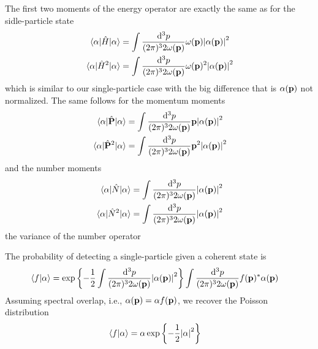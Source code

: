 The first two moments of the energy operator are exactly the same as for the sidle-particle state
\begin{align}
	\expval{\hat{H}}{\alpha}
	&=
	\int\frac{\dd[3]{p}}{(2\pi)^32\omega(\vb{p})}
	\omega(\vb{p})
	\abs{\alpha(\vb{p})}^2
	\\
	\expval{\hat{H}^2}{\alpha}
	&=
	\int\frac{\dd[3]{p}}{(2\pi)^32\omega(\vb{p})}
	\omega(\vb{p})^2
	\abs{\alpha(\vb{p})}^2
\end{align}
which is similar to our single-particle case with the big difference that is $\alpha(\vb{p})$ not normalized.
The same follows for the momentum moments
\begin{align}
	\expval{\hat{\vb{P}}}{\alpha}
	&=
	\int\frac{\dd[3]{p}}{(2\pi)^32\omega(\vb{p})}
	\vb{p}
	\abs{\alpha(\vb{p})}^2
	\\
	\expval{\hat{\vb{P}}^2}{\alpha}
	&=
	\int\frac{\dd[3]{p}}{(2\pi)^32\omega(\vb{p})}
	\vb{p}^2
	\abs{\alpha(\vb{p})}^2
\end{align}
and the number moments
\begin{align}
	\expval{\hat{N}}{\alpha}
	&=
	\int\frac{\dd[3]{p}}{(2\pi)^32\omega(\vb{p})}
	\abs{\alpha(\vb{p})}^2
	\\
	\expval{\hat{N}^2}{\alpha}
	&=
	\int\frac{\dd[3]{p}}{(2\pi)^32\omega(\vb{p})}
	\abs{\alpha(\vb{p})}^2
\end{align}
the variance of the number operator

The probability of detecting a single-particle given a coherent state is
\begin{equation}
	\begin{split}
		\braket{f}{\alpha}
		&=
		\exp\left\{
			-
			\frac{1}{2}
			\int\frac{\dd[3]{p}}{(2\pi)^32\omega(\vb{p})}
			\abs{\alpha(\vb{p})}^2
		\right\}
		\int\frac{\dd[3]{p}}{(2\pi)^32\omega(\vb{p})}
		f(\vb{p})^*
		\alpha(\vb{p})
	\end{split}
\end{equation}
Assuming spectral overlap, i.e., $\alpha(\vb{p})=\alpha f(\vb{p})$, we recover the Poisson distribution
\begin{equation}
	\begin{split}
		\braket{f}{\alpha}
		&=
		\alpha
		\exp\left\{
			-
			\frac{1}{2}
			\abs{\alpha}^2
		\right\}
	\end{split}
\end{equation}